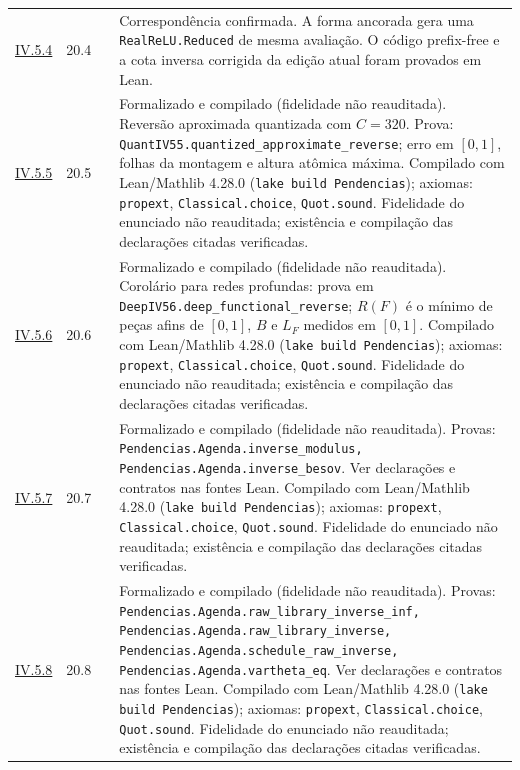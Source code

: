 \documentclass[12pt,a4paper]{article}
\theoremstyle{preciso}
\theoremstyle{definition}
\newcommand{\code}[1]{\nolinkurl{#1}}
\theoremstyle{preciso}
\theoremstyle{preciso}
\theoremstyle{preciso}
\theoremstyle{preciso}
\theoremstyle{definition}
\theoremstyle{preciso}
\theoremstyle{definition}
\theoremstyle{preciso}
\theoremstyle{preciso}
\theoremstyle{definition}
\begin{document}
\begin{singlespace}
\begin{longtable}{@{}p{.11\linewidth}p{.09\linewidth}p{.09\linewidth}p{.59\linewidth}@{}}
\hyperref[map:artigo_3:5.4]{IV.5.4} & 20.4 & \pageref{map:artigo_3:5.4} & Correspondência confirmada. A forma ancorada gera uma \code{RealReLU.Reduced} de mesma avaliação. O código prefix-free e a cota inversa corrigida da edição atual foram provados em Lean.\\[4pt]
\hyperref[map:artigo_3:5.5]{IV.5.5} & 20.5 & \pageref{map:artigo_3:5.5} & Formalizado e compilado (fidelidade não reauditada). Reversão aproximada quantizada com $C=320$. Prova: \code{QuantIV55.quantized_approximate_reverse}; erro em $[0,1]$, folhas da montagem e altura atômica máxima. Compilado com Lean/Mathlib 4.28.0 (\texttt{lake build Pendencias}); axiomas: \texttt{propext}, \texttt{Classical.choice}, \texttt{Quot.sound}. Fidelidade do enunciado não reauditada; existência e compilação das declarações citadas verificadas.\\[4pt]
\hyperref[map:artigo_3:5.6]{IV.5.6} & 20.6 & \pageref{map:artigo_3:5.6} & Formalizado e compilado (fidelidade não reauditada). Corolário para redes profundas: prova em \code{DeepIV56.deep_functional_reverse}; $R(F)$ é o mínimo de peças afins de $[0,1]$, $B$ e $L_F$ medidos em $[0,1]$. Compilado com Lean/Mathlib 4.28.0 (\texttt{lake build Pendencias}); axiomas: \texttt{propext}, \texttt{Classical.choice}, \texttt{Quot.sound}. Fidelidade do enunciado não reauditada; existência e compilação das declarações citadas verificadas.\\[4pt]
\hyperref[map:artigo_3:5.7]{IV.5.7} & 20.7 & \pageref{map:artigo_3:5.7} & Formalizado e compilado (fidelidade não reauditada). Provas: \code{Pendencias.Agenda.inverse_modulus, Pendencias.Agenda.inverse_besov}. Ver declarações e contratos nas fontes Lean. Compilado com Lean/Mathlib 4.28.0 (\texttt{lake build Pendencias}); axiomas: \texttt{propext}, \texttt{Classical.choice}, \texttt{Quot.sound}. Fidelidade do enunciado não reauditada; existência e compilação das declarações citadas verificadas.\\[4pt]
\hyperref[map:artigo_3:5.8]{IV.5.8} & 20.8 & \pageref{map:artigo_3:5.8} & Formalizado e compilado (fidelidade não reauditada). Provas: \code{Pendencias.Agenda.raw_library_inverse_inf, Pendencias.Agenda.raw_library_inverse, Pendencias.Agenda.schedule_raw_inverse, Pendencias.Agenda.vartheta_eq}. Ver declarações e contratos nas fontes Lean. Compilado com Lean/Mathlib 4.28.0 (\texttt{lake build Pendencias}); axiomas: \texttt{propext}, \texttt{Classical.choice}, \texttt{Quot.sound}. Fidelidade do enunciado não reauditada; existência e compilação das declarações citadas verificadas.\\[4pt]

\end{longtable}
\end{singlespace}
\end{document}
